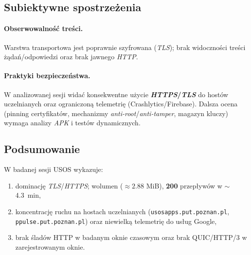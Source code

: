 \subsection{Subiektywne spostrzeżenia}
\paragraph{Obserwowalność treści.}
Warstwa transportowa jest poprawnie szyfrowana (\emph{TLS}); brak widoczności treści żądań/odpowiedzi oraz brak jawnego \emph{HTTP}.

\paragraph{Praktyki bezpieczeństwa.}
W analizowanej sesji widać konsekwentne użycie \textbf{\emph{HTTPS}/\emph{TLS}} do hostów uczelnianych oraz ograniczoną telemetrię (Crashlytics/Firebase). Dalsza ocena (pinning certyfikatów, mechanizmy \emph{anti-root}/\emph{anti-tamper}, magazyn kluczy) wymaga analizy \emph{APK} i testów dynamicznych.

\subsection{Podsumowanie}
W badanej sesji USOS wykazuje:
\begin{enumerate}
\item dominację \emph{TLS}/\emph{HTTPS}; wolumen ($\approx 2.88$ MiB), \textbf{200} przepływów w $\sim$\SI{4.3}{\minute},
\item koncentrację ruchu na hostach uczelnianych (\texttt{usosapps.put.poznan.pl}, \texttt{ppulse.put.poznan.pl}) oraz niewielką telemetrię do usług Google,
\item brak śladów HTTP w badanym oknie czasowym oraz brak QUIC/HTTP/3 w zarejestrowanym oknie.
\end{enumerate}
